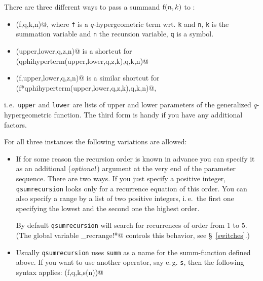 There are three different ways to pass a summand ${\mathrm f}(n,k)$
to {\verb@qsumrecursion@}:
%
\begin{itemize}
	\item {\verb@qsumrecursion(f,q,k,n)@}, where {\tt f} is a
		$q$-hypergeometric term wrt. {\tt k} and {\tt n},
		{\tt k} is the summation variable and {\tt n} the recursion
		variable, {\tt q} is a symbol.
	\item {\verb@qsumrecursion(upper,lower,q,z,n)@} is a shortcut for \\
		{\verb@qsumrecursion(qphihyperterm(upper,lower,q,z,k),q,k,n)@}
	\item {\verb@qsumrecursion(f,upper,lower,q,z,n)@} is a similar 
		shortcut for\\
		{\verb@qsumrecursion(f*qphihyperterm(upper,lower,q,z,k),q,k,n)@},
\end{itemize}
%
i.\,e.\ {\tt upper} and {\tt lower} are lists of upper and lower
parameters of the generalized $q$-hypergeometric function.
The third form is handy if you have any additional factors.

For all three instances the following variations are allowed:
\begin{itemize}
	\item If for some reason the recursion order is known in
		advance you can specify it as an additional ({\sl optional}\,)
		argument at the very end of the parameter sequence. There are two
		ways. If you just specify a positive integer, 
		{\tt qsumrecursion} looks only for a recurrence equation of this order.
		You can also specify a range by a list of two positive integers,
		i.\,e.\ the first one specifying the lowest and the second one the
		highest order.

		By default {\tt qsumrecursion} will search for recurrences
		of order from 1 to 5. (The global variable 
		{\verb@qsumrecursion_recrange!*@} controls this behavior,
		see \S~\ref{switches}.)
	\item Usually {\tt qsumrecursion} uses {\tt summ} as a name
		for the $\mathrm{summ}$-function defined above. If you want
		to use another operator, say e.\,g. {\tt s}, then the
		following syntax applies: {\verb@qsumrecursion(f,q,k,s(n))@}
\end{itemize}

